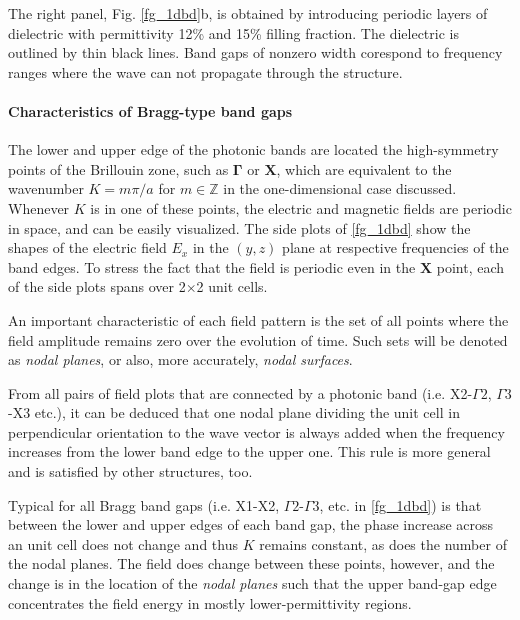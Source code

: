 The right panel, Fig. \ref{fg_1dbd}b, is obtained by introducing periodic layers of dielectric with permittivity 12\% and 15\% filling fraction. The dielectric is outlined by thin black lines. Band gaps of nonzero width corespond to frequency ranges where the wave can not propagate through the structure. %

\paragraph{Characteristics of Bragg-type band gaps}%
The lower and upper edge of the photonic bands are located the high-symmetry points of the Brillouin zone, such as $\mathbf{\Gamma}$ or $\mathbf{X}$, which are equivalent to the wavenumber $K=m\pi/a$ for $m\in\mathbb{Z}$ in the one-dimensional case discussed. Whenever $K$ is in one of these points, the electric and magnetic fields are periodic in space, and can be easily visualized. The side plots of \ref{fg_1dbd} show the shapes of the electric field $E_x$ in the $(y,z)$ plane at respective frequencies of the band edges. To stress the fact that the field is periodic even in the $\mathbf{X}$ point, each of the side plots spans over 2$\times$2 unit cells. 

An important characteristic of each field pattern is the set of all points where the field amplitude remains zero over the evolution of time. Such sets will be denoted as \textit{nodal planes}, or also, more accurately, \textit{nodal surfaces}.

From all pairs of field plots that are connected by a photonic band (i.e. X2-$\Gamma2$, $\Gamma3$-X3 etc.), it can be deduced that one nodal plane dividing the unit cell in perpendicular orientation to the wave vector is always added when the frequency increases from the lower band edge to the upper one. This rule is more general and is satisfied by other structures, too. 

Typical for all Bragg band gaps (i.e. X1-X2, $\Gamma2$-$\Gamma3$, etc. in \ref{fg_1dbd}) is that between the lower and upper edges of each band gap, the phase increase across an unit cell does not change and thus $K$ remains constant, as does the number of the nodal planes. The field does change between these points, however, and the change is in the location of the \textit{nodal planes} such that the upper band-gap edge concentrates the field energy in mostly lower-permittivity regions. 

